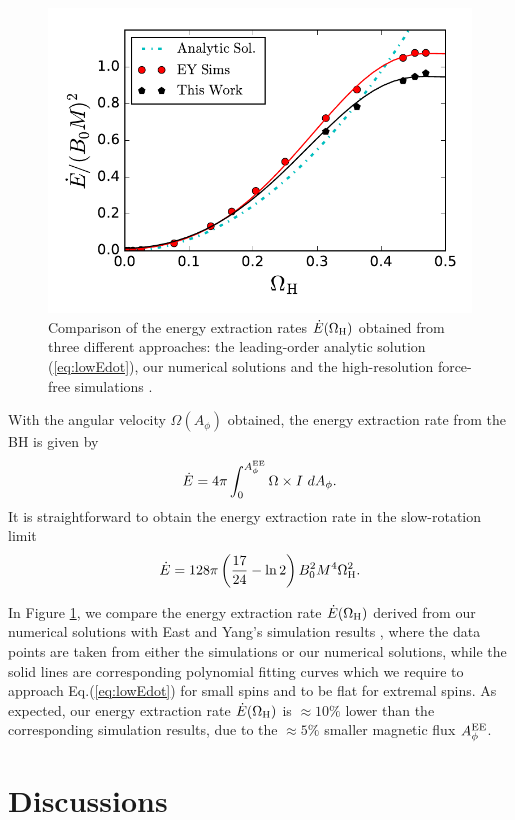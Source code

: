 \documentclass[aps,prd,reprint,nofootinbib, superscriptaddress]{revtex4-1}
\def\Ap{A_\phi}
\def\be{\begin{equation}}
\def\ee{\end{equation}}
\def\WH{\Omega_{\rm H}}
\def\AEE{A_\phi^{\rm EE}}
\begin{document}
\begin{figure}
\includegraphics[scale=0.6]{f3}
\caption{\label{fig:Edot} Comparison of the energy extraction rates $\dot E(\WH)$ obtained from
three different approaches: the leading-order analytic solution (\ref{eq:lowEdot}),
our numerical solutions and  the high-resolution force-free simulations \cite{East2018}.}
\end{figure}

With the angular velocity $\Omega(\Ap)$ obtained, the energy extraction rate from the BH is given by
\be
\label{eq:Edot}
\dot E = 4\pi \int_0^{\AEE} \Omega \times I \ d \Ap.
\ee
It is straightforward to obtain the energy extraction rate in the slow-rotation limit
\be
\label{eq:lowEdot}
\dot E = 128\pi \left(\frac{17}{24}-\ln 2\right) B_0^2 M^4 \WH^2.
\ee

In Figure \ref{fig:Edot}, we compare the energy extraction rate $\dot E(\WH)$
derived from our numerical solutions with East and Yang's simulation results
\cite{East2018}, where the data points are taken from either the simulations
or our numerical solutions, while the solid lines are corresponding polynomial
fitting curves which we require to approach Eq.(\ref{eq:lowEdot}) for small
spins and to be flat for extremal spins. As expected, our energy extraction
rate $\dot E(\WH)$ is $\approx 10\%$ lower than the corresponding simulation results,
due to the $\approx 5\%$ smaller magnetic flux $\AEE$.

\section{Discussions}
\label{sec:discussion}
\end{document}
